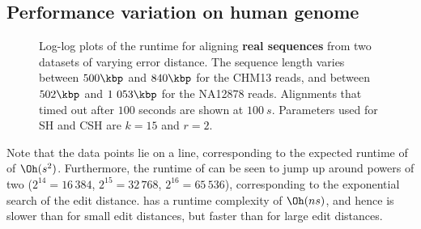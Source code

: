 \subsection{Performance variation on human genome}\label{GLOBALsec:variation-human-results}

\begin{figure}[t]
  \centering
  \hfill
  \caption[Runtime scaling with alignment cost]{Log-log plots of the runtime for aligning \textbf{real sequences}
  from two datasets of varying error distance. The sequence length varies
  between $500\kbp$ and $840\kbp$ for the CHM13 reads, and between $502\kbp$ and
  $1\ 053\kbp$ for the NA12878 reads. Alignments that timed out after $100$
  seconds are shown at $\qty{100}{s}$. Parameters used for SH and CSH are
  $k{=}15$ and $r{=}2$.}
  \label{GLOBALfig:human-results-unsorted}
\end{figure}

Note that the \wfa data points lie on a line, corresponding to the
expected runtime of \wfa of $\Oh(s^2)$. Furthermore, the runtime of \edlib can be
seen to jump up around powers of two ($2^{14} {=} 16\,384$, $2^{15} {=} 32\,768$,
$2^{16} {=} 65\,536$), corresponding to the exponential search of the edit
distance. \edlib has a runtime complexity of $\Oh(ns)$, and hence is slower than
\wfa for small edit distances, but faster than \wfa for large edit distances.
